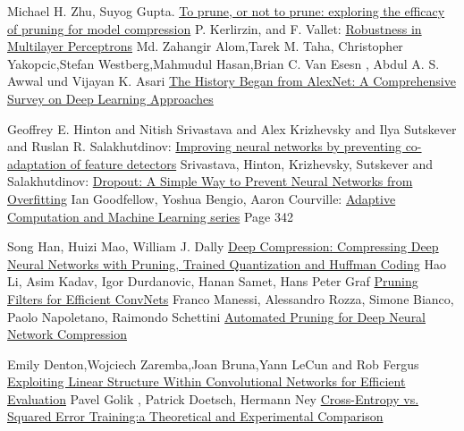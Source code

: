 \documentclass[12pt,a4paper]{scrartcl}
\numberwithin{equation}{section}
\begin{document}
\begin{thebibliography}{lem00}
		Michael H. Zhu, Suyog Gupta.
		\href{https://www.arxiv-vanity.com/papers/1710.01878/}{To prune, or not to prune: exploring the efficacy of pruning for model compression}
	P. Kerlirzin, and F. Vallet: \href{ https://www.mitpressjournals.org/doi/abs/10.1162/neco.1993.5.3.473?journalCode=neco} {Robustness in Multilayer Perceptrons}
		Md. Zahangir Alom,Tarek M. Taha, Christopher Yakopcic,Stefan Westberg,Mahmudul Hasan,Brian C. Van Esesn , Abdul A. S. Awwal und Vijayan K. Asari \href{https://arxiv.org/abs/1803.01164}{The History Began from AlexNet: A Comprehensive Survey on Deep Learning Approaches}
	
 	Geoffrey E. Hinton and Nitish Srivastava and Alex Krizhevsky and Ilya Sutskever and Ruslan R. Salakhutdinov: \href{https://arxiv.org/abs/1207.0580}{Improving neural networks by preventing co-adaptation of feature detectors}
 	Srivastava, Hinton, Krizhevsky, Sutskever and Salakhutdinov: \href{http://jmlr.org/papers/volume15/srivastava14a.old/srivastava14a.pdf}{Dropout: A Simple Way to Prevent Neural Networks from Overfitting}
Ian Goodfellow, Yoshua Bengio, Aaron Courville:
\href{https://www.amazon.com/Deep-Learning-Adaptive-Computation-Machine/dp/0262035618/ref=as_li_ss_tl?ieTF8&qid=1548018253&sr=8-3&keywords=deep+learning&linkCode=sl1&tag=inspiredalgor-20&linkId=49b3b1cce7e04bb3c9b99f2d878bf805&language=en_US}{Adaptive Computation and Machine Learning series} Page 342
 
	 Song Han, Huizi Mao, William J. Dally \href{https://arxiv.org/abs/1510.00149}{Deep Compression: Compressing Deep Neural Networks with Pruning, Trained Quantization and Huffman Coding}
 	Hao Li, Asim Kadav, Igor Durdanovic, Hanan Samet, Hans Peter Graf
 	\href{https://arxiv.org/abs/1608.08710}{Pruning Filters for Efficient ConvNets}
      Franco Manessi, Alessandro Rozza, Simone Bianco, Paolo Napoletano, Raimondo Schettini \href{https://arxiv.org/abs/1712.01721}{Automated Pruning for Deep Neural Network Compression}
      
   		Emily Denton,Wojciech Zaremba,Joan Bruna,Yann LeCun and	Rob Fergus
   		\href{https://arxiv.org/pdf/1404.0736.pdf}{Exploiting Linear Structure Within Convolutional
   			Networks for Efficient Evaluation}
 	 Pavel Golik , Patrick Doetsch, Hermann Ney
 	\href{http://books.jackon.me/Cross-Entropy-vs-Squared-Error-Training-a-Theoretical-and-Experimental-Comparison.pdf}{Cross-Entropy vs. Squared Error Training:a Theoretical and Experimental Comparison}
 	

\end{thebibliography}
\end{document}
